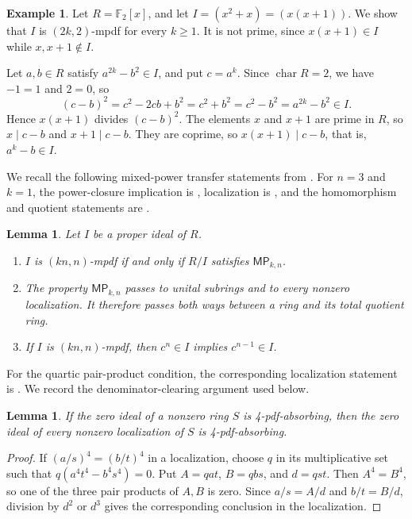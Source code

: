 \documentclass[11pt,a4paper]{amsart}
\newtheorem{lemma}[theorem]{Lemma}
\theoremstyle{definition}
\newtheorem{example}[theorem]{Example}
\theoremstyle{remark}
\newcommand{\MP}[2]{\mathsf{MP}_{#1,#2}}
\numberwithin{equation}{section}
\begin{document}
\begin{example}
Let $R=\mathbb F_2[x]$, and let $I=(x^2+x)=(x(x+1))$.
We show that $I$ is $(2k,2)$-mpdf for every $k\ge1$.
It is not prime, since $x(x+1)\in I$ while $x,x+1\notin I$.

Let $a,b\in R$ satisfy $a^{2k}-b^2\in I$, and put $c=a^k$.
Since $\operatorname{char}R=2$, we have $-1=1$ and $2=0$, so
\[
(c-b)^2=c^2-2cb+b^2=c^2+b^2=c^2-b^2=a^{2k}-b^2\in I.
\]
Hence $x(x+1)$ divides $(c-b)^2$.
The elements $x$ and $x+1$ are prime in $R$, so $x\mid c-b$ and $x+1\mid c-b$.
They are coprime, so $x(x+1)\mid c-b$, that is, $a^k-b\in I$.
\end{example}

We recall the following mixed-power transfer statements from \cite{TS}.
For $n=3$ and $k=1$, the power-closure implication is
\cite[Proposition~2.4]{Far}, localization is
\cite[Theorem~2.15]{Far}, and the homomorphism and quotient
statements are \cite[Theorem~2.16 and Corollary~2.17]{Far}.

\begin{lemma}\label{lem:transfers}
Let $I$ be a proper ideal of $R$.
\begin{enumerate}
\item $I$ is $(kn,n)$-mpdf if and only if $R/I$ satisfies $\MP{k}{n}$.
\item The property $\MP{k}{n}$ passes to unital subrings and to every
nonzero localization. It therefore passes both ways between a ring and
its total quotient ring.
\item If $I$ is $(kn,n)$-mpdf, then $c^n\in I$ implies $c^{n-1}\in I$.
\end{enumerate}
\end{lemma}

For the quartic pair-product condition, the corresponding localization
statement is \cite[Proposition~3.6]{TAHA}. We record the
denominator-clearing argument used below.

\begin{lemma}\label{quartic:localization}
If the zero ideal of a nonzero ring $S$ is 4-pdf-absorbing, then the
zero ideal of every nonzero localization of $S$ is 4-pdf-absorbing.
\end{lemma}
\begin{proof}
If $(a/s)^4=(b/t)^4$ in a localization, choose $q$ in its
multiplicative set such that $q(a^4t^4-b^4s^4)=0$.
Put $A=qat$, $B=qbs$, and $d=qst$. Then $A^4=B^4$, so one
of the three pair products of $A,B$ is zero. Since $a/s=A/d$
and $b/t=B/d$, division by $d^2$ or $d^3$ gives the corresponding
conclusion in the localization.
\end{proof}
\end{document}
